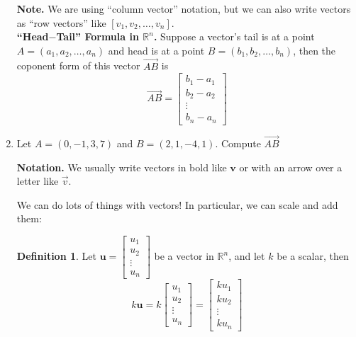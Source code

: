 \documentclass[12pt]{amsart}
\newcommand{\R}{\mathbb{R}}
\theoremstyle{definition}
\newtheorem*{definition}{Definition}
\begin{document}
\begin{enumerate}[itemsep=0.8em,leftmargin=0pt]
\noindent \textbf{Note.} We are using ``column vector'' notation, but we can also write vectors as ``row vectors'' like $[v_1,v_2,\ldots,v_n]$.\\

\noindent \textbf{``Head$-$Tail'' Formula in $\mathbb{R}^n$.}
    Suppose a vector's tail is at a point $A=(a_1,a_2,\ldots,a_n)$ and head is at a point $B=(b_1,b_2,\ldots,b_n)$, then the coponent form of this vector $\vec{AB}$ is
    \[
        \vec{AB} =
        \left[\begin{array}{c}
             b_1 - a_1  \\
             b_2 - a_2 \\
             \vdots \\
             b_n-a_n
        \end{array}\right]
    \]


\item Let $A=(0,-1,3,7)$ and $B=(2,1,-4,1)$. Compute $\vec{AB}$

\vspace{0.8em}

\noindent \textbf{Notation.} We usually write vectors in bold like $\mathbf{v}$ or with an arrow over a letter like $\vec{v}$.

\noindent We can do lots of things with vectors! In particular, we can scale and add them:

\begin{definition}
    Let $\mathbf{u}=\begin{bmatrix}
    u_1\\
    u_2\\
    \vdots\\
    u_n
    \end{bmatrix}$ be a vector in $\R^n$, and let $k$ be a scalar, then
      $$k\mathbf{u}=k\begin{bmatrix}
    u_1\\
    u_2\\
    \vdots\\
    u_n
    \end{bmatrix}=\begin{bmatrix}
    ku_1\\
    ku_2\\
    \vdots\\
    ku_n
    \end{bmatrix}$$
\end{definition}


\end{enumerate}
\end{document}
